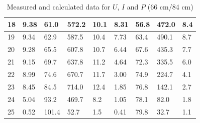 \documentclass[12pt, a4paper]{article}
\begin{document}
\begin{table}[H]
\begin{center}
\begin{tabular}{|l|llll|llll|}
	18 & \multicolumn{1}{l|}{9.38}   & \multicolumn{1}{l|}{61.0}    & \multicolumn{1}{l|}{572.2}     & 10.1      & \multicolumn{1}{l|}{8.31}   & \multicolumn{1}{l|}{56.8}    & \multicolumn{1}{l|}{472.0}     & 8.4       \\ \hline
	19 & \multicolumn{1}{l|}{9.34}   & \multicolumn{1}{l|}{62.9}    & \multicolumn{1}{l|}{587.5}     & 10.4      & \multicolumn{1}{l|}{7.73}   & \multicolumn{1}{l|}{63.4}    & \multicolumn{1}{l|}{490.1}     & 8.7       \\ \hline
	20 & \multicolumn{1}{l|}{9.28}   & \multicolumn{1}{l|}{65.5}    & \multicolumn{1}{l|}{607.8}     & 10.7      & \multicolumn{1}{l|}{6.44}   & \multicolumn{1}{l|}{67.6}    & \multicolumn{1}{l|}{435.3}     & 7.7       \\ \hline
	21 & \multicolumn{1}{l|}{9.15}   & \multicolumn{1}{l|}{69.7}    & \multicolumn{1}{l|}{637.8}     & 11.2      & \multicolumn{1}{l|}{4.64}   & \multicolumn{1}{l|}{72.3}    & \multicolumn{1}{l|}{335.5}     & 6.0       \\ \hline
	22 & \multicolumn{1}{l|}{8.99}   & \multicolumn{1}{l|}{74.6}    & \multicolumn{1}{l|}{670.7}     & 11.7      & \multicolumn{1}{l|}{3.00}   & \multicolumn{1}{l|}{74.9}    & \multicolumn{1}{l|}{224.7}     & 4.1       \\ \hline
	23 & \multicolumn{1}{l|}{8.45}   & \multicolumn{1}{l|}{84.5}    & \multicolumn{1}{l|}{714.0}     & 12.4      & \multicolumn{1}{l|}{1.85}   & \multicolumn{1}{l|}{76.8}    & \multicolumn{1}{l|}{142.1}     & 2.7       \\ \hline
	24 & \multicolumn{1}{l|}{5.04}   & \multicolumn{1}{l|}{93.2}    & \multicolumn{1}{l|}{469.7}     & 8.2       & \multicolumn{1}{l|}{1.05}   & \multicolumn{1}{l|}{78.1}    & \multicolumn{1}{l|}{82.0}      & 1.8       \\ \hline
	25 & \multicolumn{1}{l|}{0.52}   & \multicolumn{1}{l|}{101.4}   & \multicolumn{1}{l|}{52.7}      & 1.5       & \multicolumn{1}{l|}{0.41}   & \multicolumn{1}{l|}{79.8}    & \multicolumn{1}{l|}{32.7}      & 1.1       \\ \hline
	\end{tabular}
	\caption{Measured and calculated data for $U$, $I$ and $P$ (66 cm/84 cm)}
	\end{center}
\end{table}
\end{document}
